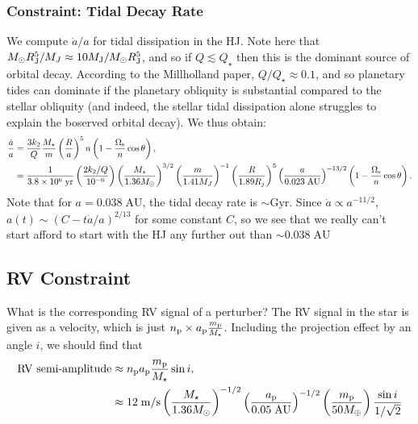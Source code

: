 \documentclass[11pt,
        usenames, %
        dvipsnames %
    ]{article}
\newcommand*{\scinot}[2]{#1\times10^{#2}}
\newcommand*{\p}[1]{\left(#1\right)}
\begin{document}
\subsubsection{Constraint: Tidal Decay Rate}

We compute $\dot{a} / a$ for tidal dissipation in the HJ\@. Note here that
$M_\odot R_{\rm J}^5/M_J \approx 10 M_{\rm J} / M_\odot R_{\rm J}^5$, and so if
$Q \lesssim Q_\star$ then this is the dominant source of orbital decay.
According to the Millholland paper, $Q / Q_\star \approx 0.1$, and so planetary
tides can dominate if the planetary obliquity is substantial compared to the
stellar obliquity (and indeed, the stellar tidal dissipation alone struggles to
explain the boserved orbital decay). We thus obtain:
\begin{align}
    \frac{\dot{a}}{a} &= \frac{3k_2}{Q}\frac{M_\star}{m} \p{\frac{R}{a}}^5n
            \p{1 - \frac{\Omega_{\rm s}}{n}\cos \theta},\\
        &= \frac{1}{\scinot{3.8}{6}\;\mathrm{yr}}
            \p{\frac{2k_2/Q}{10^{-6}}}
            \p{\frac{M_\star}{1.36 M_{\odot}}}^{3/2}
            \p{\frac{m}{1.41M_J}}^{-1}
            \p{\frac{R}{1.89R_j}}^5
            \p{\frac{a}{0.023\;\mathrm{AU}}}^{-13/2}
            \p{1 - \frac{\Omega_{\rm s}}{n}\cos \theta}.
\end{align}
Note that for $a = 0.038\;\mathrm{AU}$, the tidal decay rate is $\sim
\mathrm{Gyr}$. Since $\dot{a} \propto a^{-11/2}$, $a(t) \sim (C - t\dot{a} /
a)^{2/13}$ for some constant $C$, so we see that we really can't start afford to
start with the HJ any further out than $\sim 0.038\;\mathrm{AU}$

\subsection{RV Constraint}

What is the corresponding RV signal of a perturber? The RV signal in the star
is given as a velocity, which is just $n_{\rm p} \times a_{\rm p}\frac{m_{\rm
p}}{M_{\star}}$. Including the projection effect by an angle $i$, we should find
that
\begin{align}
    \text{RV semi-amplitude} &\approx
            n_{\rm p}a_{\rm p}\frac{m_{\rm p}}{M_{\star}} \sin i,\\
        &\approx 12\;\mathrm{m/s}
            \p{\frac{M_\star}{1.36M_{\odot}}}^{-1/2}
            \p{\frac{a_{\rm p}}{0.05\;\mathrm{AU}}}^{-1/2}
            \p{\frac{m_{\rm p}}{50M_{\oplus}}}
            \frac{\sin i}{1/\sqrt{2}}
\end{align}
\end{document}
